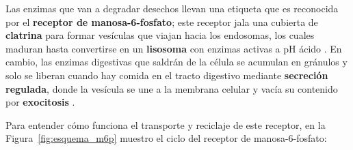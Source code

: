 \documentclass[spanish,letterpaper,oneside]{article}
\begin{document}
Las enzimas que van a degradar desechos llevan una etiqueta que es reconocida por el \textbf{receptor de manosa-6-fosfato}; este receptor jala una cubierta de \textbf{clatrina} para formar vesículas que viajan hacia los endosomas, los cuales maduran hasta convertirse en un \textbf{lisosoma} con enzimas activas a pH ácido \parencite{kierszenbaum2020histologia, lieberman2018marks}. En cambio, las enzimas digestivas que saldrán de la célula se acumulan en gránulos y solo se liberan cuando hay comida en el tracto digestivo mediante \textbf{secreción regulada}, donde la vesícula se une a la membrana celular y vacía su contenido por \textbf{exocitosis} \parencite{kierszenbaum2020histologia, karp2019biologia}.

Para entender cómo funciona el transporte y reciclaje de este receptor, en la Figura~\ref{fig:esquema_m6p} muestro el ciclo del receptor de manosa-6-fosfato:
\end{document}
